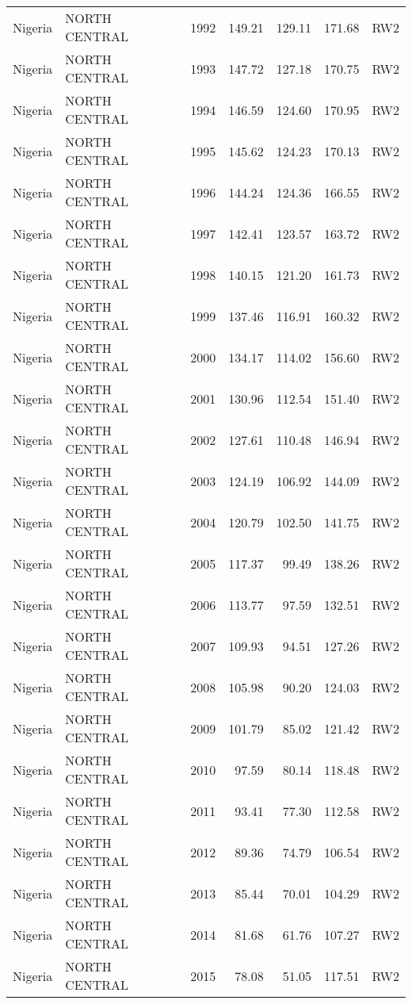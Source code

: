 \begin{longtable}{lllrrrl}
  Nigeria & NORTH CENTRAL & 1992 & 149.21 & 129.11 & 171.68 & RW2 \\ 
  Nigeria & NORTH CENTRAL & 1993 & 147.72 & 127.18 & 170.75 & RW2 \\ 
  Nigeria & NORTH CENTRAL & 1994 & 146.59 & 124.60 & 170.95 & RW2 \\ 
  Nigeria & NORTH CENTRAL & 1995 & 145.62 & 124.23 & 170.13 & RW2 \\ 
  Nigeria & NORTH CENTRAL & 1996 & 144.24 & 124.36 & 166.55 & RW2 \\ 
  Nigeria & NORTH CENTRAL & 1997 & 142.41 & 123.57 & 163.72 & RW2 \\ 
  Nigeria & NORTH CENTRAL & 1998 & 140.15 & 121.20 & 161.73 & RW2 \\ 
  Nigeria & NORTH CENTRAL & 1999 & 137.46 & 116.91 & 160.32 & RW2 \\ 
  Nigeria & NORTH CENTRAL & 2000 & 134.17 & 114.02 & 156.60 & RW2 \\ 
  Nigeria & NORTH CENTRAL & 2001 & 130.96 & 112.54 & 151.40 & RW2 \\ 
  Nigeria & NORTH CENTRAL & 2002 & 127.61 & 110.48 & 146.94 & RW2 \\ 
  Nigeria & NORTH CENTRAL & 2003 & 124.19 & 106.92 & 144.09 & RW2 \\ 
  Nigeria & NORTH CENTRAL & 2004 & 120.79 & 102.50 & 141.75 & RW2 \\ 
  Nigeria & NORTH CENTRAL & 2005 & 117.37 & 99.49 & 138.26 & RW2 \\ 
  Nigeria & NORTH CENTRAL & 2006 & 113.77 & 97.59 & 132.51 & RW2 \\ 
  Nigeria & NORTH CENTRAL & 2007 & 109.93 & 94.51 & 127.26 & RW2 \\ 
  Nigeria & NORTH CENTRAL & 2008 & 105.98 & 90.20 & 124.03 & RW2 \\ 
  Nigeria & NORTH CENTRAL & 2009 & 101.79 & 85.02 & 121.42 & RW2 \\ 
  Nigeria & NORTH CENTRAL & 2010 & 97.59 & 80.14 & 118.48 & RW2 \\ 
  Nigeria & NORTH CENTRAL & 2011 & 93.41 & 77.30 & 112.58 & RW2 \\ 
  Nigeria & NORTH CENTRAL & 2012 & 89.36 & 74.79 & 106.54 & RW2 \\ 
  Nigeria & NORTH CENTRAL & 2013 & 85.44 & 70.01 & 104.29 & RW2 \\ 
  Nigeria & NORTH CENTRAL & 2014 & 81.68 & 61.76 & 107.27 & RW2 \\ 
  Nigeria & NORTH CENTRAL & 2015 & 78.08 & 51.05 & 117.51 & RW2 \\ 

\end{longtable}
